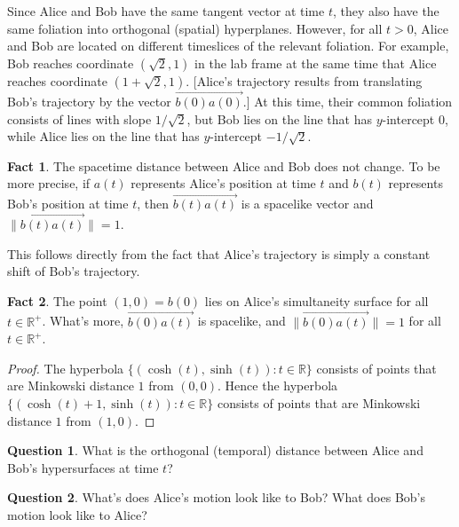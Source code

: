 \documentclass[tikz,border=10pt,fleqn]{article}
\theoremstyle{definition}
\newtheorem*{question}{Question}
\newtheorem*{fact}{Fact}
\newcommand{\vecc}[1]{\overrightarrow{#1}}
\begin{document}
  \bigskip \noindent Since Alice and Bob have the same tangent vector
  at time $t$, they also have the same foliation into orthogonal
  (spatial) hyperplanes. However, for all $t>0$, Alice and Bob are
  located on different timeslices of the relevant foliation. For
  example, Bob reaches coordinate $(\sqrt{2},1)$ in the lab frame at
  the same time that Alice reaches coordinate
  $(1+\sqrt{2},1)$. [Alice's trajectory results from translating Bob's
  trajectory by the vector $\vecc{b(0)a(0)}$.]  At this time, their
  common foliation consists of lines with slope $1/\sqrt{2}$, but Bob
  lies on the line that has $y$-intercept $0$, while Alice lies on the
  line that has $y$-intercept $-1/\sqrt{2}$.

  \begin{fact} The spacetime distance between Alice and Bob does not
    change. To be more precise, if $a(t)$ represents Alice's position
    at time $t$ and $b(t)$ represents Bob's position at time $t$, then
    $\vecc{b(t)a(t)}$ is a spacelike vector and
    $\| \vecc{b(t)a(t)} \|=1$. \end{fact}

This follows directly from the fact that Alice's trajectory is simply
a constant shift of Bob's trajectory.

\begin{fact} The point $(1,0)=b(0)$ lies on Alice's simultaneity
  surface for all $t\in\mathbb{R}^+$. What's more, $\vecc{b(0)a(t)}$
  is spacelike, and $\| \vecc{b(0)a(t)}\| =1$ for all
  $t\in\mathbb{R}^+$. \end{fact}

\begin{proof} The hyperbola
  $\{ (\cosh (t),\sinh(t)):t\in\mathbb{R} \}$ consists of points that
  are Minkowski distance $1$ from $(0,0)$. Hence the hyperbola
  $\{ (\cosh (t)+1,\sinh (t)):t\in\mathbb{R}\}$ consists of points
  that are Minkowski distance $1$ from $(1,0)$.
\end{proof}


\begin{question} What is the orthogonal (temporal) distance between
  Alice and Bob's hypersurfaces at time $t$? \end{question}

\begin{question} What's does Alice's motion look like to Bob? What
  does Bob's motion look like to Alice? \end{question}
  
\end{document}

